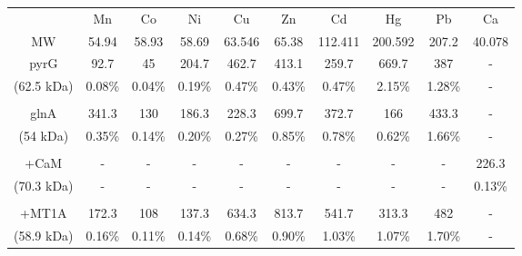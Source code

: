 \documentclass[10pt]{article} %
\begin{document}
%
\vspace{3\baselineskip}
%

\begin{tabular}{cccccccccc}
  \toprule
    & Mn & Co & Ni & Cu & Zn & Cd & Hg & Pb & Ca  \\
    MW & 54.94 & 58.93 & 58.69 & 63.546 & 65.38 & 112.411 & 200.592 & 207.2 & 40.078 \\
  \midrule
  pyrG
    & 92.7 & 45 & 204.7 & 462.7 & 413.1 & 259.7 & 669.7 & 387 & - \\
  (62.5 kDa)
    & 0.08\%
    & \cellcolor{green} 0.04\%
    & \cellcolor{green} 0.19\%
    & \cellcolor{green} 0.47\%
    & 0.43\%
    & \cellcolor{green} 0.47\%
    & \cellcolor{green} 2.15\%
    & \cellcolor{green} 1.28\% & - \\
  \\
  glnA
    & 341.3 & 130 & 186.3 & 228.3 & 699.7 & 372.7 & 166 & 433.3 & - \\
  (54 kDa)
    & 0.35\%
    & \cellcolor{green} 0.14\%
    & \cellcolor{green} 0.20\%
    & \cellcolor{green} 0.27\%
    & 0.85\%
    & \cellcolor{green} 0.78\%
    & \cellcolor{green} 0.62\%
    & \cellcolor{green} 1.66\% & - \\
  \\
  +CaM
    & - & - & - & - & - & - & - & - & 226.3 \\
  (70.3 kDa)
    & - & - & - & - & - & - & - & - & 0.13\% \\
  \\
  +MT1A
    & 172.3 & 108 & 137.3 & 634.3 & 813.7 & 541.7 & 313.3 & 482 & - \\
  (58.9 kDa)
    & 0.16\%
    & \cellcolor{green} 0.11\%
    & \cellcolor{green} 0.14\%
    & \cellcolor{green} 0.68\%
    & 0.90\%
    & \cellcolor{green} 1.03\%
    & \cellcolor{green} 1.07\%
    & \cellcolor{green} 1.70\% & - \\
  \bottomrule
\end{tabular}
\end{document}
